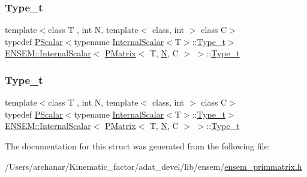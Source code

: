 \subsubsection{\texorpdfstring{Type\_t}{Type\_t}\hspace{0.1cm}{\footnotesize\ttfamily [1/2]}}
{\footnotesize\ttfamily template$<$class T , int N, template$<$ class, int $>$ class C$>$ \\
typedef \mbox{\hyperlink{classENSEM_1_1PScalar}{P\+Scalar}}$<$typename \mbox{\hyperlink{structENSEM_1_1InternalScalar}{Internal\+Scalar}}$<$T$>$\+::\mbox{\hyperlink{structENSEM_1_1InternalScalar_3_01PMatrix_3_01T_00_01N_00_01C_01_4_01_4_a8f6d0ab798cf3ec250a72a2bc706c676}{Type\+\_\+t}}$>$ \mbox{\hyperlink{structENSEM_1_1InternalScalar}{E\+N\+S\+E\+M\+::\+Internal\+Scalar}}$<$ \mbox{\hyperlink{classENSEM_1_1PMatrix}{P\+Matrix}}$<$ T, \mbox{\hyperlink{operator__name__util_8cc_a7722c8ecbb62d99aee7ce68b1752f337}{N}}, C $>$ $>$\+::\mbox{\hyperlink{structENSEM_1_1InternalScalar_3_01PMatrix_3_01T_00_01N_00_01C_01_4_01_4_a8f6d0ab798cf3ec250a72a2bc706c676}{Type\+\_\+t}}}

\mbox{\label{structENSEM_1_1InternalScalar_3_01PMatrix_3_01T_00_01N_00_01C_01_4_01_4_a8f6d0ab798cf3ec250a72a2bc706c676}} 
\subsubsection{\texorpdfstring{Type\_t}{Type\_t}\hspace{0.1cm}{\footnotesize\ttfamily [2/2]}}
{\footnotesize\ttfamily template$<$class T , int N, template$<$ class, int $>$ class C$>$ \\
typedef \mbox{\hyperlink{classENSEM_1_1PScalar}{P\+Scalar}}$<$typename \mbox{\hyperlink{structENSEM_1_1InternalScalar}{Internal\+Scalar}}$<$T$>$\+::\mbox{\hyperlink{structENSEM_1_1InternalScalar_3_01PMatrix_3_01T_00_01N_00_01C_01_4_01_4_a8f6d0ab798cf3ec250a72a2bc706c676}{Type\+\_\+t}}$>$ \mbox{\hyperlink{structENSEM_1_1InternalScalar}{E\+N\+S\+E\+M\+::\+Internal\+Scalar}}$<$ \mbox{\hyperlink{classENSEM_1_1PMatrix}{P\+Matrix}}$<$ T, \mbox{\hyperlink{operator__name__util_8cc_a7722c8ecbb62d99aee7ce68b1752f337}{N}}, C $>$ $>$\+::\mbox{\hyperlink{structENSEM_1_1InternalScalar_3_01PMatrix_3_01T_00_01N_00_01C_01_4_01_4_a8f6d0ab798cf3ec250a72a2bc706c676}{Type\+\_\+t}}}



The documentation for this struct was generated from the following file\+:\begin{DoxyCompactItemize}
\item 
/\+Users/archanar/\+Kinematic\+\_\+factor/adat\+\_\+devel/lib/ensem/\mbox{\hyperlink{lib_2ensem_2ensem__primmatrix_8h}{ensem\+\_\+primmatrix.\+h}}\end{DoxyCompactItemize}
